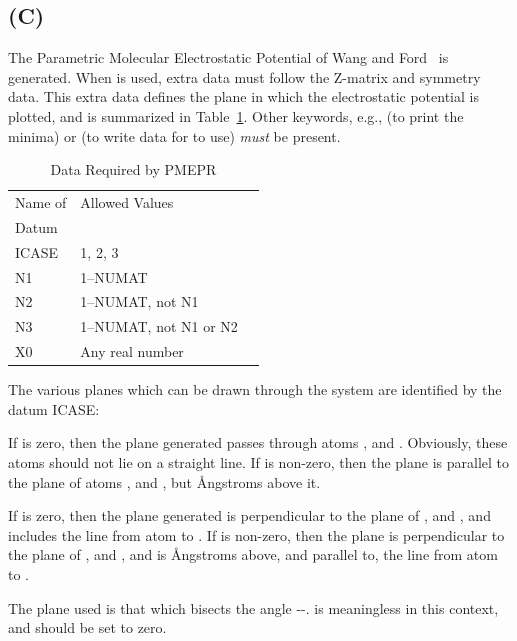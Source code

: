 \subsection*{ (C)}
The Parametric Molecular Electrostatic Potential of Wang and Ford~\cite{pmep1,pmep2}
is generated. When  is used, extra data must follow the Z-matrix and
symmetry
data.  This extra data defines the plane in which the electrostatic
potential is plotted, and is summarized in Table~\ref{pmepd}.
Other keywords, e.g.,  (to print the minima) or
 (to write data for  to use) {\em must}
be present.

\begin{table}
\caption{\label{pmepd} Data Required by PMEPR}
\begin{center}
\begin{tabular}{lll}\hline
Name of  & Allowed Values&   \\
Datum    &         &          \\ \hline
ICASE    &  1, 2, 3 & \\
N1       & 1--NUMAT  & \\
N2       & 1--NUMAT, not N1 & \\
N3       & 1--NUMAT, not N1 or N2 & \\
X0       & Any real number   & \\ \hline
\end{tabular}
\end{center}
\end{table}
The various planes which can be drawn through the system are identified by the
datum ICASE:
\begin{description}
\item{} If  is zero, then the plane generated passes through
atoms ,  and .  Obviously, these atoms should not
lie on a straight line.  If  is non-zero, then the plane is parallel to
the plane of atoms ,  and , but   \AA ngstroms
above it.
\item{} If  is zero, then the plane generated is perpendicular
to the plane of ,  and , and includes the line
from atom  to .  If  is non-zero, then the plane  is
perpendicular to the plane of ,  and , and is 
\AA ngstroms above, and parallel to,
the line from atom  to .

\item{} The plane used is that which bisects the angle
--.   is meaningless in this context, and should
be set to zero.
\end{description}

